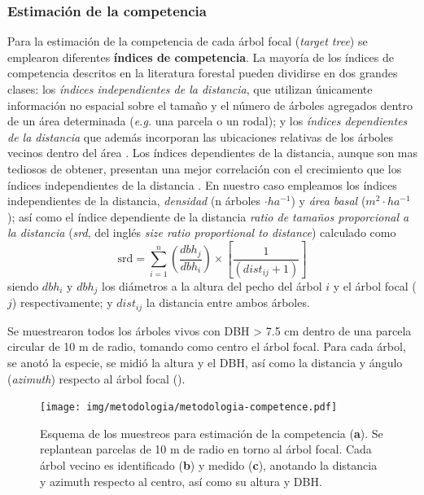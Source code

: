\subsubsection{Estimación de la competencia}
\label{sec:metodologia:competencia}
Para la estimación de la competencia de cada árbol focal (\emph{target tree}) se emplearon diferentes \textbf{índices de competencia}. La mayoría de los índices de competencia descritos en la literatura forestal pueden dividirse en dos grandes clases: los \emph{índices independientes de la distancia}, que utilizan únicamente información no espacial sobre el tamaño y el número de árboles agregados dentro de un área determinada (\emph{e.g.} una parcela o un rodal); y los \emph{índices dependientes de la distancia} que además incorporan las ubicaciones relativas de los árboles vecinos dentro del área \autocite{Contreras2011,GeaIzquierdoCanellas2009AnalysisHolm,BurkhartTome2012IndicesIndividualtree}. Los índices dependientes de la distancia, aunque son mas tediosos de obtener, presentan una mejor correlación con el crecimiento que los índices independientes de la distancia \autocites{GeaIzquierdoCanellas2009AnalysisHolm,Contreras2011,Maleki2015}. En nuestro caso empleamos los índices independientes de la distancia, \emph{densidad} (n árboles $\cdot ha^{-1}$) y \emph{área basal} ($m^{2} \cdot ha^{-1}$); así como el índice dependiente de la distancia \emph{ratio de tamaños proporcional a la distancia} (\emph{srd}, del inglés \emph{size ratio proportional to distance}) calculado como \[\mathrm{srd} = \sum_{i=1}^{n} ( \frac{dbh_j}{dbh_i}) \times \left[\frac{1}{(dist_{ij} + 1)} \right]\]
siendo \(dbh_i\) y \(dbh_j\) los diámetros a la altura del pecho del árbol $i$ y el árbol focal ($j$) respectivamente; y \(dist_{ij}\) la distancia entre ambos árboles.

Se muestrearon todos los árboles vivos con DBH \textgreater{} 7.5 cm dentro de una parcela circular de 10 m de radio, tomando como centro el árbol focal. Para cada árbol, se anotó la especie, se midió la altura y el DBH, así como la distancia y ángulo (\emph{azimuth}) respecto al árbol focal ().


\begin{figure}
	\centering
	\texttt{[image: img/metodologia/metodologia-competence.pdf]}
	\caption{
	Esquema de los muestreos para estimación de la competencia (\textbf{a}). Se replantean parcelas de 10 m de radio en torno al árbol focal. Cada árbol vecino es identificado (\textbf{b}) y medido (\textbf{c}), anotando la distancia y azimuth respecto al centro, así como su altura y DBH.}\label{fig:metodologia:competence}
\end{figure}

